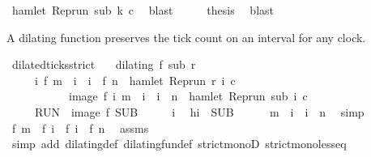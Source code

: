 \begin{isabellebody}
\ {\isacartoucheopen}hamlet\ {\isacharparenleft}{\isacharparenleft}Rep{\isacharunderscore}run\ sub{\isacharparenright}\ k\ c{\isacharparenright}{\isacartoucheclose}\ \isamarkupfalse%
\ blast\isanewline
\ \ \isamarkupfalse%
\ \isamarkupfalse%
\ {\isacharquery}thesis\ \isamarkupfalse%
\ blast\isanewline
{}\isamarkupfalse%
%
\endisatagproof
{\isafoldproof}%
%
\isadelimproof
%
\endisadelimproof
%
\begin{isamarkuptext}%
A dilating function preserves the tick count on an interval for any clock.%
\end{isamarkuptext}\isamarkuptrue%
\isamarkupfalse%
\ dilated{\isacharunderscore}ticks{\isacharunderscore}strict{\isacharcolon}\isanewline
\ \ \ {\isacartoucheopen}dilating\ f\ sub\ r{\isacartoucheclose}\isanewline
\ \ \ \ \ {\isacartoucheopen}{\isacharbraceleft}i{\isachardot}\ f\ m\ {\isacharless}\ i\ {\isasymand}\ i\ {\isacharless}\ f\ n\ {\isasymand}\ hamlet\ {\isacharparenleft}{\isacharparenleft}Rep{\isacharunderscore}run\ r{\isacharparenright}\ i\ c{\isacharparenright}{\isacharbraceright}\isanewline
\ \ \ \ \ \ \ \ \ \ {\isacharequal}\ image\ f\ {\isacharbraceleft}i{\isachardot}\ m\ {\isacharless}\ i\ {\isasymand}\ i\ {\isacharless}\ n\ {\isasymand}\ hamlet\ {\isacharparenleft}{\isacharparenleft}Rep{\isacharunderscore}run\ sub{\isacharparenright}\ i\ c{\isacharparenright}{\isacharbraceright}{\isacartoucheclose}\isanewline
\ \ \ \ {\isacharparenleft}\ {\isacartoucheopen}{\isacharquery}RUN\ {\isacharequal}\ image\ f\ {\isacharquery}SUB{\isacartoucheclose}{\isacharparenright}\isanewline
%
\isadelimproof
%
\endisadelimproof
%
\isatagproof
{}\isamarkupfalse%
\isanewline
\ \ \isacommand{{\isacharbraceleft}}\isamarkupfalse%
\ \isamarkupfalse%
\ i\ \isamarkupfalse%
\ h{\isacharcolon}{\isacartoucheopen}i\ {\isasymin}\ {\isacharquery}SUB{\isacartoucheclose}\isanewline
\ \ \ \ \isamarkupfalse%
\ {\isacartoucheopen}m\ {\isacharless}\ i\ {\isasymand}\ i\ {\isacharless}\ n{\isacartoucheclose}\ \isamarkupfalse%
\ simp\isanewline
\ \ \ \ \isamarkupfalse%
\ {\isacartoucheopen}f\ m\ {\isacharless}\ f\ i\ {\isasymand}\ f\ i\ {\isacharless}\ {\isacharparenleft}f\ n{\isacharparenright}{\isacartoucheclose}\ \isamarkupfalse%
\ assms\isanewline
\ \ \ \ \ \ \isamarkupfalse%
\ {\isacharparenleft}simp\ add{\isacharcolon}\ dilating{\isacharunderscore}def\ dilating{\isacharunderscore}fun{\isacharunderscore}def\ strict{\isacharunderscore}monoD\ strict{\isacharunderscore}mono{\isacharunderscore}less{\isacharunderscore}eq{\isacharparenright}\isanewline

\end{isabellebody}
